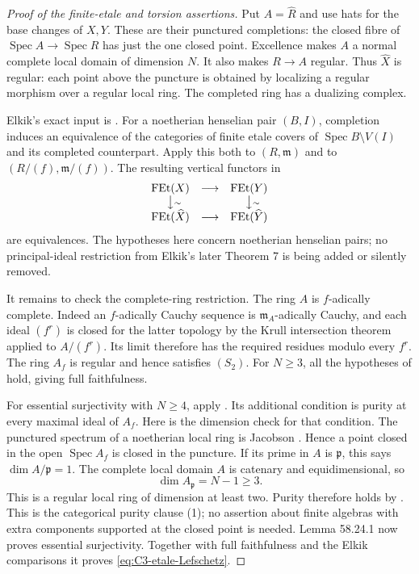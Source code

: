 \begin{proof}[Proof of the finite-etale and torsion assertions]
Put $A=\widehat R$ and use hats for the base changes
of $X,Y$. These are their punctured completions:
the closed fibre of $\operatorname{Spec}A\to
\operatorname{Spec}R$ has just the one closed
point. Excellence makes $A$ a normal complete
local domain of dimension $N$. It also makes
$R\to A$ regular. Thus $\widehat X$ is regular:
each point above the puncture is obtained by
localizing a regular morphism over a regular
local ring. The completed ring has a dualizing
complex.

Elkik's exact input is
\citet[Section III, Theorem 5, pp.~577--579, and
its corollary on p.~579]{D_Elkik1973}.
For a noetherian henselian pair $(B,I)$, completion
induces an equivalence of the categories of
finite etale covers of
$\operatorname{Spec}B\setminus V(I)$ and its
completed counterpart. Apply this both to
$(R,\mathfrak m)$ and to $(R/(f),\mathfrak m/(f))$.
The resulting vertical functors in
\[
\begin{array}{ccc}
 \operatorname{FEt}(X)&\longrightarrow&\operatorname{FEt}(Y)\\
 \big\downarrow\rlap{$\scriptstyle\sim$}&&
 \big\downarrow\rlap{$\scriptstyle\sim$}\\
 \operatorname{FEt}(\widehat X)&\longrightarrow&
 \operatorname{FEt}(\widehat Y)
\end{array}
\]
are equivalences. The hypotheses here concern
noetherian henselian pairs; no principal-ideal
restriction from Elkik's later Theorem 7 is
being added or silently removed.

It remains to check the complete-ring restriction.
The ring $A$ is $f$-adically complete. Indeed
an $f$-adically Cauchy sequence is
$\mathfrak m_A$-adically Cauchy, and each
ideal $(f^r)$ is closed for the latter topology
by the Krull intersection theorem applied to
$A/(f^r)$. Its limit therefore has the required
residues modulo every $f^r$.
The ring $A_f$ is regular and hence satisfies
$(S_2)$. For $N\ge3$, all the hypotheses of
\citet[Lemma 58.19.5, Tag 0EK5]{D_StacksEtaleLefschetz}
hold, giving full faithfulness.

For essential surjectivity with $N\ge4$, apply
\citet[Lemma 58.24.1, Tag 0EK9]{D_StacksEtaleLefschetz}.
Its additional condition is purity at every
maximal ideal of $A_f$. Here is the dimension
check for that condition. The punctured spectrum
of a noetherian local ring is Jacobson
\citep[Lemma 28.6.4, Tag 02IM]{D_StacksEtaleLefschetz}.
Hence a point closed in the open $\operatorname{Spec}A_f$
is closed in the puncture. If its prime in $A$
is $\mathfrak p$, this says
$\dim A/\mathfrak p=1$. The complete local domain
$A$ is catenary and equidimensional, so
\[
                \dim A_{\mathfrak p}=N-1\ge3.
\]
This is a regular local ring of dimension at
least two. Purity therefore holds by
\citet[Lemma 58.21.3(1), Tag 0BMA]{D_StacksEtaleLefschetz}.
This is the categorical purity clause (1);
no assertion about finite algebras with extra
components supported at the closed point is
needed. Lemma 58.24.1 now proves essential
surjectivity. Together with full faithfulness
and the Elkik comparisons it proves
\eqref{eq:C3-etale-Lefschetz}.


\end{proof}

